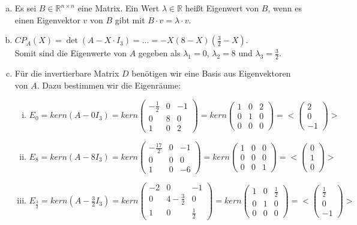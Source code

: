 \documentclass[a4paper,11pt]{scrartcl}
\newcommand{\RR}{\mathbb{R}}
\begin{document}
\begin{enumerate}[a)]
\item Es sei $B\in\RR^{n\times n}$ eine Matrix. Ein Wert $\lambda \in \RR$ heißt Eigenwert von $B$, wenn es einen Eigenvektor $v$ von $B$ gibt mit $B\cdot v = \lambda\cdot v$.
\item $CP_A(X)=\det(A-X\cdot I_3)=...=-X(8-X)(\frac{3}{2}-X)$. \\
Somit sind die Eigenwerte von $A$ gegeben als $\lambda_1=0$, $\lambda_2=8$ und $\lambda_3=\frac{3}{2}$.
\item Für die invertierbare Matrix $D$ benötigen wir eine Basis aus Eigenvektoren von $A$. Dazu bestimmen wir die Eigenräume:
\begin{enumerate}[i)]
\item $E_0=kern(A-0I_3)=kern\begin{pmatrix} -\frac{1}{2} & 0 & -1 \\ 0 & 8 & 0 \\ 1 & 0 &2 \end{pmatrix}=kern\begin{pmatrix} 1 & 0 & 2 \\ 0 & 1 & 0 \\ 0 & 0 &0 \end{pmatrix}=<\begin{pmatrix} 2\\0\\-1 \end{pmatrix}>$
\item $E_8=kern(A-8I_3)=kern\begin{pmatrix} -\frac{17}{2} & 0 & -1 \\ 0 & 0 & 0 \\ 1 & 0 &-6 \end{pmatrix}=kern\begin{pmatrix} 1 & 0 & 0 \\ 0 & 0 & 0 \\ 0 & 0 &1 \end{pmatrix}=<\begin{pmatrix} 0\\1\\0 \end{pmatrix}>$
\item $E_\frac{3}{2}=kern(A-\frac{3}{2}I_3)=kern\begin{pmatrix} -2 & 0 & -1 \\ 0 & 4-\frac{3}{2} & 0 \\ 1 & 0 &\frac{1}{2} \end{pmatrix}=kern\begin{pmatrix} 1 & 0 & \frac{1}{2} \\ 0 & 1 & 0 \\ 0 & 0 &0 \end{pmatrix}=<\begin{pmatrix} \frac{1}{2}\\0\\-1 \end{pmatrix}>$

\end{enumerate}
\end{enumerate}
\end{document}

